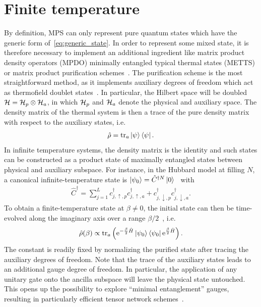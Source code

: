 \section{Finite temperature}
\label{sec:finite_temperature}
%
%
By definition, MPS can only represent pure quantum states which have the generic form of~\cref{eq:generic_state}.
In order to represent some mixed state, it is therefore necessary to implement an additional ingredient like matrix product density operators (MPDO) minimally entangled typical thermal states (METTS) or matrix product purification schemes~\cite{Binder2015}.
The purification scheme is the most straightforward method, as it implements auxiliary degrees of freedom which act as thermofield doublet states~\cite{Barnett1987}.
In particular, the Hilbert space will be doubled $\mathcal{H} = \mathcal{H}_p\otimes\mathcal{H}_a$, in which $\mathcal{H}_p$ and $\mathcal{H}_a$ denote the physical and auxiliary space.
The density matrix of the thermal system is then a trace of the pure density matrix with respect to the auxiliary states, i.e.
\begin{align}
    \hat\rho = {\rm tr}_a\ket\psi\bra\psi.
\end{align}
In infinite temperature systems, the density matrix is the identity and such states can be constructed as a product state of maximally entangled states between physical and auxiliary subspace.
For instance, in the Hubbard model at filling $N$, a canonical infinite-temperature state is $\ket{\psi_0}=\hat C^{\dag N}\ket0$~\cite{Barthel2016} with
\begin{align}
    \hat C^\dag = \sum_{j=1}^L c^\dag_{j,\uparrow,p}c^\dag_{j,\uparrow,a} + c^\dag_{j,\downarrow,p}c^\dag_{j,\downarrow,a}.
\end{align}
To obtain a finite-temperature state at $\beta\neq0$, the initial state can then be time-evolved along the imaginary axis over a range $\beta/2$~\cite{Barnett1987}, i.e.
\begin{align}
    \hat\rho(\beta) \propto {\rm tr}_a\left( \mathrm e^{-\frac\beta2\hat H}\ket{\psi_0}\bra{\psi_0}\mathrm e^{\frac\beta2\hat H} \right).
\end{align}
The constant is readily fixed by normalizing the purified state after tracing the auxiliary degrees of freedom.
Note that the trace of the auxiliary states leads to an additional gauge degree of freedom.
In particular, the application of any unitary gate onto the ancilla subspace will leave the physical state untouched.
This opens up the possibility to explore ``minimal entanglement'' gauges, resulting in particularly efficient tensor network schemes~\cite{Barthel2013,Hauschild2018,Wolff2020}.
%
%
